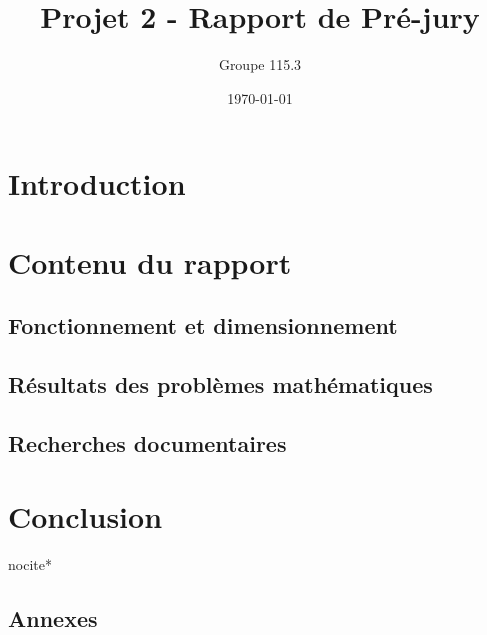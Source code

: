 \documentclass{report}
\title{Projet 2 - Rapport de Pré-jury}
\author{Groupe 115.3}
\date{\today}
\begin{document}
\maketitle
\tableofcontents

\part{Introduction}

\part{Contenu du rapport}

\chapter{Fonctionnement et dimensionnement}





\chapter{Résultats des problèmes mathématiques}





\chapter{Recherches documentaires}





\part{Conclusion}

\clearpage

nocite{*} 



\appendix
\chapter{Annexes}





%
\end{document}
